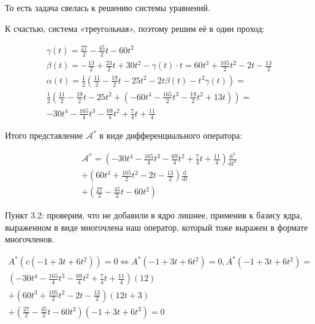 \documentclass[12pt, a4paper]{article}
\begin{document}
    То есть задача свелась к решению системы уравнений.

    К счастью, система «треугольная», поэтому решим её в один проход:

    \begin{gather*}
        \gamma(t) = \frac{27}{2} - \frac{45}{2} t - 60 t^2 \\
        \beta(t) =  -\frac{13}{2} + \frac{23}{2} t + 30 t^2  - \gamma(t) \cdot t 
        = 60 t^3 + \frac{105}{2} t^2 -2t - \frac{13}{2} \\
        \alpha(t) = \frac{1}{2}\left(\frac{11}{2} - \frac{19}{2} t - 25 t^2 - 2t \beta(t) - t^{2} \gamma(t) \right) = \\
        \frac{1}{2}\left(\frac{11}{2} - \frac{19}{2} t - 25 t^2 + (-60 t^4 -\frac{165}{2} t^3 - \frac{19}{2} t^2 + 13t) \right) = \\
        -30 t^4 - \frac{165}{4} t^3 - \frac{69}{4} t^2 + \frac{7}{4} t + \frac{11}{4}
    \end{gather*}


    Итого представление $\mathcal{A}^*$ в виде дифференциального оператора:

    \begin{multline}
        \mathcal{A}^* = \left( -30 t^4 - \frac{165}{4} t^3 - \frac{69}{4} t^2 + \frac{7}{4} t + \frac{11}{4} \right) \frac{\mathrm{d}^{2}}{\mathrm{d} t^{2}} \\
        + \left(60 t^3 + \frac{105}{2} t^2 -2t - \frac{13}{2}\right) \frac{\mathrm{d}}{\mathrm{d} t} \\
        + \left( \frac{27}{2} - \frac{45}{2} t - 60 t^2 \right)
    \end{multline}

    Пункт 3.2: проверим, что не добавили в ядро лишнее, применив к базису ядра, выраженном в виде многочлена 
    наш оператор, который тоже выражен в формате многочленов.

    \begin{multline}
        A^* (c(-1 + 3t + 6t^2)) = 0 \Leftrightarrow A^* (-1 + 3t + 6t^2) = 0, A^* (-1 + 3t + 6t^2) = \\
        \left( -30 t^4 - \frac{165}{4} t^3 - \frac{69}{4} t^2 + \frac{7}{4} t + \frac{11}{4} \right) (12) \\
        + \left(60 t^3 + \frac{105}{2} t^2 -2t - \frac{13}{2}\right) (12 t + 3) \\
        + \left( \frac{27}{2} - \frac{45}{2} t - 60 t^2 \right) (-1 + 3t + 6t^2) = 0
    \end{multline}
\end{document}
